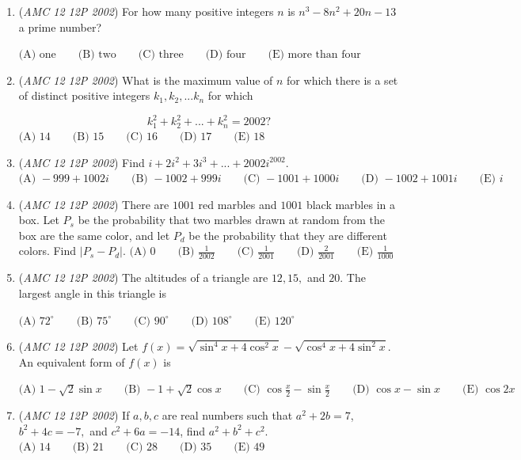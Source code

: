 \begin{enumerate}
	\item (\textit{AMC 12 12P 2002}) For how many positive integers $n$ is $n^3 - 8n^2 + 20n - 13$ a prime number?


 $\text{(A) one} \qquad \text{(B) two} \qquad \text{(C) three} \qquad \text{(D) four} \qquad \text{(E) more than four}$


	\item (\textit{AMC 12 12P 2002}) What is the maximum value of $n$ for which there is a set of distinct positive integers $k_1, k_2, ... k_n$ for which


 
 \[k^2_1 + k^2_2 + ... + k^2_n = 2002?\]
$\text{(A) }14 \qquad \text{(B) }15 \qquad \text{(C) }16 \qquad \text{(D) }17 \qquad \text{(E) }18$


	\item (\textit{AMC 12 12P 2002}) Find $i + 2i^2 +3i^3 + . . . + 2002i^{2002}.$
$\text{(A) }-999 + 1002i \qquad \text{(B) }-1002 + 999i \qquad \text{(C) }-1001 + 1000i \qquad \text{(D) }-1002 + 1001i \qquad \text{(E) }i$


	\item (\textit{AMC 12 12P 2002}) There are $1001$ red marbles and $1001$ black marbles in a box. Let $P_s$ be the probability that two marbles drawn at random from the box are the same color, and let $P_d$ be the probability that they are different colors. Find $|P_s-P_d|.$
$\text{(A) }0 \qquad \text{(B) }\frac{1}{2002} \qquad \text{(C) }\frac{1}{2001} \qquad \text{(D) }\frac {2}{2001} \qquad \text{(E) }\frac{1}{1000}$


	\item (\textit{AMC 12 12P 2002}) The altitudes of a triangle are $12, 15,$ and $20.$ The largest angle in this triangle is


 $\text{(A) }72^\circ \qquad \text{(B) }75^\circ \qquad \text{(C) }90^\circ \qquad \text{(D) }108^\circ \qquad \text{(E) }120^\circ$


	\item (\textit{AMC 12 12P 2002}) Let $f(x) = \sqrt{\sin^4{x} + 4 \cos^2{x}} - \sqrt{\cos^4{x} + 4 \sin^2{x}}.$ An equivalent form of $f(x)$ is


 $\text{(A) }1-\sqrt{2}\sin{x} \qquad \text{(B) }-1+\sqrt{2}\cos{x} \qquad \text{(C) }\cos{\frac{x}{2}} - \sin{\frac{x}{2}} \qquad \text{(D) }\cos{x} - \sin{x} \qquad \text{(E) }\cos{2x}$


	\item (\textit{AMC 12 12P 2002}) If $a,b,c$ are real numbers such that $a^2 + 2b =7$, $b^2 + 4c= -7,$ and $c^2 + 6a= -14$, find $a^2 + b^2 + c^2.$
$\text{(A) }14 \qquad \text{(B) }21 \qquad \text{(C) }28 \qquad \text{(D) }35 \qquad \text{(E) }49$



\end{enumerate}
